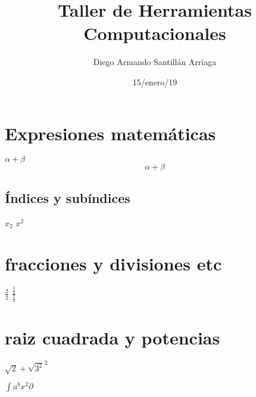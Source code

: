 \documentclass{article}
\title{\Huge Taller de Herramientas Computacionales}
\author {Diego Armando Santillán Arriaga}
\date{15/enero/19}
\begin{document}
\maketitle
	\begin{center}
	\end{center}
\newpage

\section*{Expresiones matemáticas}
$\alpha + \beta$\\ %
\[\alpha + \beta\] %

\subsection{Índices y subíndices}
$x_{2}$
$x^2$\\

\section{fracciones y divisiones etc}
$\frac{2}{2}$
$\frac{\frac{3}{4}}{\frac{2}{3}}$

\section{raiz cuadrada y potencias}
$\sqrt{2} + \sqrt{3^2}^2$

$\int {a}^{b} x^2 \partial$
\end{document}
